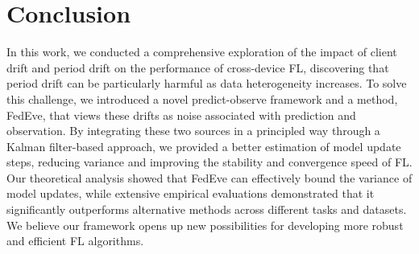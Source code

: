 \section{Conclusion}

In this work, we conducted a comprehensive exploration of the impact of client drift and period drift on the performance of cross-device FL, discovering that period drift can be particularly harmful as data heterogeneity increases. To solve this challenge, we introduced a novel predict-observe framework and a method, FedEve, that views these drifts as noise associated with prediction and observation. By integrating these two sources in a principled way through a Kalman filter-based approach, we provided a better estimation of model update steps, reducing variance and improving the stability and convergence speed of FL. Our theoretical analysis showed that FedEve can effectively bound the variance of model updates, while extensive empirical evaluations demonstrated that it significantly outperforms alternative methods across different tasks and datasets.
We believe our framework opens up new possibilities for developing more robust and efficient FL algorithms.